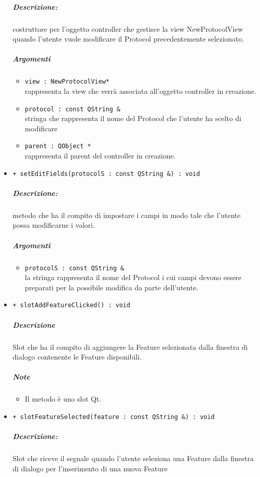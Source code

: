 \begin{itemize}
			\color{black}
			\subparagraph{Descrizione:} costruttore per l'oggetto controller che gestisce la view NewProtocolView quando l'utente vuole modificare il Protocol\g{} precedentemente selezionato.
			\color{black}
			\subparagraph{Argomenti}
			\begin{itemize}
				\item \color{RoyalPurple} \verb!view : NewProtocolView*!\\				
\color{black} rappresenta la view che verrà associata all'oggetto controller in creazione.
				\item \color{RoyalPurple} \verb!protocol : const QString &!\\				
\color{black} stringa che rappresenta il nome del Protocol\g{} che l'utente ha scelto di modificare
				\item \color{RoyalPurple} \verb!parent : QObject *!\\				
\color{black} rappresenta il parent del controller in creazione.
			\end{itemize}
			\item \color{blue} \verb!+ setEditFields(protocolS : const QString &) : void!
			\color{black}
			\subparagraph{Descrizione:} metodo che ha il compito di impostare i campi in modo tale che l'utente possa modificarne i valori.
			\color{black}
			\subparagraph{Argomenti}
			\begin{itemize}
				\item \color{RoyalPurple} \verb!protocolS : const QString &!\\				
\color{black} la stringa rappresenta il nome del Protocol\g{} i cui campi devono essere preparati per la possibile modifica da parte dell'utente.
			\end{itemize}
			\item \color{blue} \verb!+ slotAddFeatureClicked() : void!
			\color{black}
			\subparagraph{Descrizione} Slot\g{} che ha il compito di aggiungere la Feature\g{} selezionata dalla finestra di dialogo contenente le Feature\g{} disponibili.
			\subparagraph{Note}
			\begin{itemize}
				\item Il metodo è uno slot\g{} Qt\g{}.
			\end{itemize}
			\item \color{blue} \verb!+ slotFeatureSelected(feature : const QString &) : void!
			\color{black}
			\subparagraph{Descrizione:} Slot\g{} che riceve il segnale quando l'utente seleziona una Feature\g{} dalla finestra di dialogo per l'inserimento di una nuova Feature\g{}

\end{itemize}
